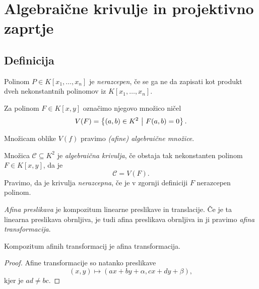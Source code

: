 \section{Algebraične krivulje in projektivno zaprtje}

\subsection{Definicija}


\begin{definicija}
Polinom $P \in K[x_1, \dots, x_n]$ je
\emph{nerazcepen}, če se ga ne da zapisati
kot produkt dveh nekonstantnih polinomov iz $K[x_1, \dots, x_n]$.
\end{definicija}

\begin{definicija}
Za polinom $F \in K[x,y]$ označimo njegovo množico ničel
\[
V(F) = \left\{(a,b) \in K^2~\middle\vert~F(a,b) = 0\right\}.
\]
\end{definicija}

\begin{opomba}
Množicam oblike $V(f)$ pravimo
\emph{(afine) algebraične množice}.
\end{opomba}

\begin{definicija}
Množica $\mathcal{C} \subseteq K^2$ je
\emph{algebraična krivulja}, če obstaja
tak nekonstanten polinom $F \in K[x,y]$, da je
\[
\mathcal{C} = V(F).
\]
Pravimo, da je krivulja
\emph{nerazcepna}, če je v
zgornji definiciji $F$ nerazcepen polinom.
\end{definicija}

\begin{definicija}
\emph{Afina preslikava} je kompozitum
linearne preslikave in translacije. Če je ta linearna preslikava
obrnljiva, je tudi afina preslikava obrnljiva in ji pravimo
\emph{afina transformacija}.
\end{definicija}

\begin{trditev}
Kompozitum afinih transformacij je afina transformacija.
\end{trditev}

\begin{proof}
Afine transformacije so natanko preslikave
\[
(x,y) \mapsto (ax + by + \alpha, cx + dy + \beta),
\]
kjer je $ad \ne bc$.
\end{proof}

